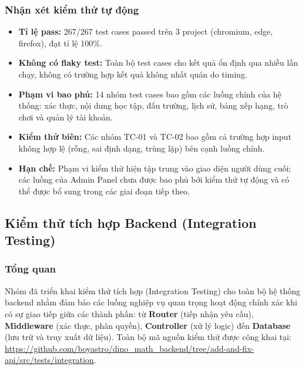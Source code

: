 \subsubsection{Nhận xét kiểm thử tự động}

\begin{itemize}[leftmargin=*]
  \item \textbf{Tỉ lệ pass:} 267/267 test cases passed trên 3 project (chromium, edge, firefox),
        đạt tỉ lệ 100\%.
  \item \textbf{Không có flaky test:} Toàn bộ test cases cho kết quả ổn định qua
        nhiều lần chạy, không có trường hợp kết quả không nhất quán do timing.
  \item \textbf{Phạm vi bao phủ:} 14 nhóm test cases bao gồm các luồng chính của
        hệ thống: xác thực, nội dung học tập, đấu trường, lịch sử, bảng xếp hạng,
        trò chơi và quản lý tài khoản.
  \item \textbf{Kiểm thử biên:} Các nhóm TC-01 và TC-02 bao gồm cả trường hợp
        input không hợp lệ (rỗng, sai định dạng, trùng lặp) bên cạnh luồng chính.
  \item \textbf{Hạn chế:} Phạm vi kiểm thử hiện tập trung vào giao diện người dùng
        cuối; các luồng của Admin Panel chưa được bao phủ bởi kiểm thử tự động và
        có thể được bổ sung trong các giai đoạn tiếp theo.
\end{itemize}

\subsection{Kiểm thử tích hợp Backend (Integration Testing)}

\subsubsection{Tổng quan}

Nhóm đã triển khai kiểm thử tích hợp (Integration Testing) cho toàn bộ hệ thống backend
nhằm đảm bảo các luồng nghiệp vụ quan trọng hoạt động chính xác khi có sự giao tiếp
giữa các thành phần: từ \textbf{Router} (tiếp nhận yêu cầu), \textbf{Middleware}
(xác thực, phân quyền), \textbf{Controller} (xử lý logic) đến \textbf{Database}
(lưu trữ và truy xuất dữ liệu). Toàn bộ mã nguồn kiểm thử được công khai tại:
\url{https://github.com/boyastro/dino_math_backend/tree/add-and-fix-api/src/tests/integration}.

